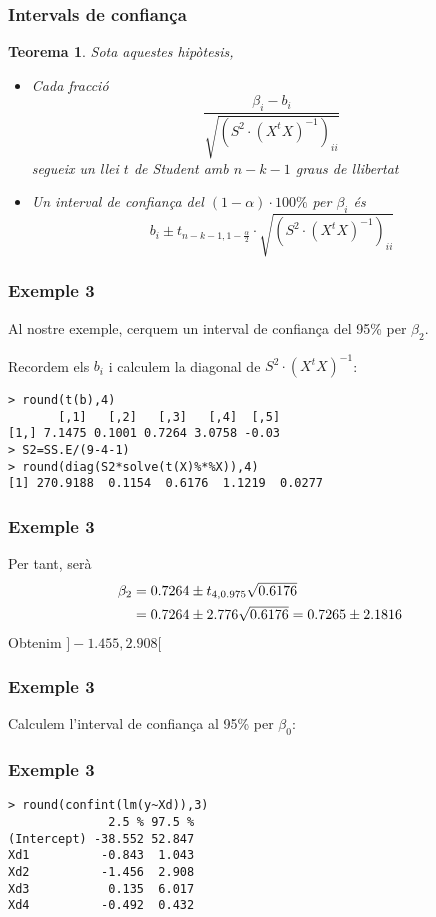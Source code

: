 \documentclass[12pt,t]{beamer}
\theoremstyle{plain}
\newtheorem{teorema}{Teorema}
\theoremstyle{definition}
\begin{document}
\begin{frame}
\frametitle{Intervals de confiança}
\begin{teorema}
Sota aquestes hipòtesis, 
\begin{itemize}
\item Cada fracció 
$$
\frac{\beta_i-b_i}{\sqrt{(S^2\cdot (X^t X)^{-1})_{ii}}}
$$
segueix un llei $t$ de Student amb $n-k-1$ graus de llibertat
\medskip

\item Un interval de confiança del $(1-\alpha)\cdot 100\%$ per $\beta_i$ és
$$
b_i\pm t_{n-k-1,1-\frac{\alpha}{2}}\cdot \sqrt{(S^2\cdot (X^t X)^{-1})_{ii}}
$$
\end{itemize}
\end{teorema}
\end{frame}


\begin{frame}[fragile]
\frametitle{Exemple 3}
Al nostre exemple, cerquem un interval de confiança del 95\% per $\beta_2$.
\medskip

Recordem els $b_i$ i calculem la diagonal de $S^2\cdot (X^t X)^{-1}$:
\begin{verbatim}
> round(t(b),4)
       [,1]   [,2]   [,3]   [,4]  [,5]
[1,] 7.1475 0.1001 0.7264 3.0758 -0.03
> S2=SS.E/(9-4-1)
> round(diag(S2*solve(t(X)%*%X)),4)
[1] 270.9188  0.1154  0.6176  1.1219  0.0277
\end{verbatim}
\end{frame}


\begin{frame}
\frametitle{Exemple 3}
Per tant, serà
$$
\begin{array}{l}
\beta_2=0.7264\pm t_{4,0.975}\sqrt{0.6176}\\[1ex]
\hphantom{\beta_2} =0.7264\pm 2.776\sqrt{0.6176}=0.7265\pm 2.1816
\end{array}
$$
Obtenim $]-1.455,2.908[$
\end{frame}


\begin{frame}
\frametitle{Exemple 3}
Calculem l'interval de confiança al 95\% per $\beta_0$:
\end{frame}


\begin{frame}[fragile]
\frametitle{Exemple 3}
\begin{verbatim}
> round(confint(lm(y~Xd)),3)
              2.5 % 97.5 %
(Intercept) -38.552 52.847
Xd1          -0.843  1.043
Xd2          -1.456  2.908
Xd3           0.135  6.017
Xd4          -0.492  0.432
\end{verbatim}

\end{frame}
\end{document}

